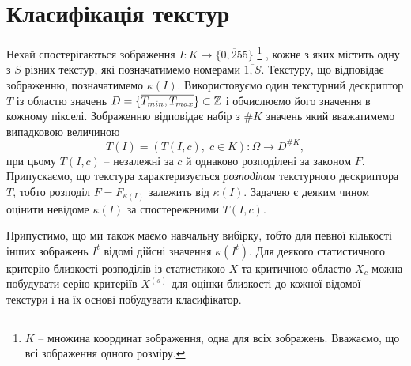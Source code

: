 
\section{Класифікація текстур}\label{section1.3}

Нехай спостерігаються зображення $I \colon K \to \{\overline{0,255}\}$ 
\footnote{$K$ -- множина координат зображення, одна для всіх зображень. Вважаємо, що всі зображення одного розміру.}
, кожне з яких містить одну з $S$ різних текстур, які позначатимемо номерами $\overline{1,S}$.
Текстуру, що відповідає зображенню, позначатимемо $\kappa(I)$.
Використовуємо один текстурний дескриптор $T$ із областю значень $D = \{\overline{T_{min}, T_{max}}\} \subset \mathbb Z$ і обчислюємо його значення в кожному пікселі. 
Зображенню відповідає набір з $\# K$ значень який вважатимемо випадковою величиною
\[ T(I) = \left(T(I,c),\; c\in K\right) \colon \Omega \to D^{\# K}, \]
при цьому $T(I,c)$ -- незалежні за $c$ й однаково розподілені за законом $F$.
Припускаємо, що текстура характеризується \emph{розподілом} текстурного дескриптора $T$, тобто розподіл $F = F_{\kappa(I)}$ залежить від $\kappa(I)$.
Задачею є деяким чином оцінити невідоме $\kappa(I)$ за спостереженими $T(I,c)$.


Припустимо, що ми також маємо навчальну вибірку, тобто для певної кількості інших зображень $I^t$ відомі дійсні значення $\kappa(I^t)$. 
Для деякого статистичного критерію близкості розподілів із статистикою $X$ та критичною областю $X_c$ можна побудувати серію критеріїв $X^{(s)}$ 
для оцінки близкості до кожної відомої текстури і на їх основі побудувати класифікатор.

